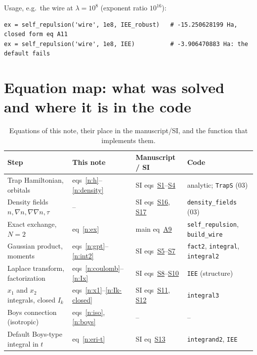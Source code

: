 \documentclass[11pt]{article}
\begin{document}
\noindent Usage, e.g.\ the wire at $\lambda=10^8$ (exponent ratio $10^{16}$):
\begin{lstlisting}[numbers=none,caption={}]
ex = self_repulsion('wire', 1e8, IEE_robust)   # -15.250628199 Ha, closed form eq A11
ex = self_repulsion('wire', 1e8, IEE)          # -3.906470883 Ha: the default fails
\end{lstlisting}

\section{Equation map: what was solved and where it is in the code}
\label{n:sec:map}
\begin{table}[H]
\centering
\caption{Equations of this note, their place in the manuscript/SI, and the function that implements them.}
\label{n:tab:map}
\small
\begin{tabular}{@{}p{4.3cm}p{3.1cm}p{3.2cm}p{4.5cm}@{}}
\toprule
Step & This note & Manuscript / SI & Code \\
\midrule
Trap Hamiltonian, orbitals & eqs~\ref{n:h}--\ref{n:density} & SI eqs~\href{si.pdf\#equation.1}{S1}--\href{si.pdf\#equation.4}{S4} & analytic; \texttt{TrapS} (03) \\
Density fields $n,\nabla n,\nabla\nabla n,\tau$ & -- & SI eqs~\href{si.pdf\#equation.16}{S16}, \href{si.pdf\#equation.17}{S17} & \texttt{density\_fields} (03) \\
Exact exchange, $N=2$ & eq~\ref{n:ex} & main eq~\href{main.pdf\#equation.9}{A9} & \texttt{self\_repulsion}, \texttt{build\_wire} \\
Gaussian product, moments & eqs~\ref{n:gpt}--\ref{n:int2} & SI eqs~\href{si.pdf\#equation.5}{S5}--\href{si.pdf\#equation.7}{S7} & \texttt{fact2}, \texttt{integral}, \texttt{integral2} \\
Laplace transform, factorization & eqs~\ref{n:coulomb}--\ref{n:Ix} & SI eqs~\href{si.pdf\#equation.8}{S8}--\href{si.pdf\#equation.10}{S10} & \texttt{IEE} (structure) \\
$x_1$ and $x_2$ integrals, closed $I_k$ & eqs~\ref{n:x1}--\ref{n:Ik-closed} & SI eqs~\href{si.pdf\#equation.11}{S11}, \href{si.pdf\#equation.12}{S12} & \texttt{integral3} \\
Boys connection (isotropic) & eqs~\ref{n:iso}, \ref{n:boys} & -- & -- \\
Default Boys-type integral in $t$ & eq~\ref{n:eri-t} & SI eq~\href{si.pdf\#equation.13}{S13} & \texttt{integrand2}, \texttt{IEE} \\

\end{tabular}
\end{table}
\end{document}

